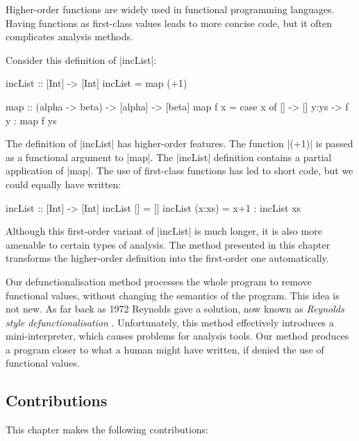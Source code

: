 Higher-order functions are widely used in functional programming languages.  Having functions as first-class values leads to more concise code, but it often complicates analysis methods.

\begin{example}
\label{exF:incList}

Consider this definition of |incList|:

\begin{code}
incList :: [Int] -> [Int]
incList = map (+1)

map :: (alpha -> beta) -> [alpha] -> [beta]
map f x = case  x of
                []    -> []
                y:ys  -> f y : map f ys
\end{code}

The definition of |incList| has higher-order features. The function |(+1)| is passed as a functional argument to |map|. The |incList| definition contains a partial application of |map|. The use of first-class functions has led to short code, but we could equally have written:

\begin{code}
incList :: [Int] -> [Int]
incList []      = []
incList (x:xs)  = x+1 : incList xs
\end{code}

Although this first-order variant of |incList| is much longer, it is also more amenable to certain types of analysis. The method presented in this chapter transforms the higher-order definition into the first-order one automatically.
\end{example}

Our defunctionalisation method processes the whole program to remove functional values, without changing the semantics of the program. This idea is not new. As far back as 1972 Reynolds gave a solution, now known as \textit{Reynolds style defunctionalisation} \cite{reynolds:defunc}. Unfortunately, this method effectively introduces a mini-interpreter, which causes problems for analysis tools. Our method produces a program closer to what a human might have written, if denied the use of functional values.


\subsection{Contributions}

This chapter makes the following contributions:

